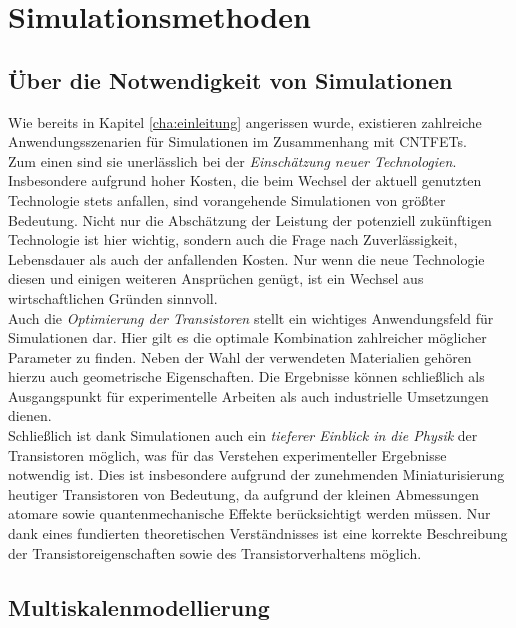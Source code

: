 \chapter{Simulationsmethoden}
\label{cha:simulationsmethoden}

\section{Über die Notwendigkeit von Simulationen}
\label{ueberdienotwendigkeitvonsimulationen}

Wie bereits in Kapitel \ref{cha:einleitung} angerissen wurde, existieren zahlreiche Anwendungsszenarien für Simulationen im Zusammenhang mit CNTFETs.\\
Zum einen sind sie unerlässlich bei der \textit{Einschätzung neuer Technologien}. Insbesondere aufgrund hoher Kosten, die beim Wechsel der aktuell genutzten Technologie stets anfallen, sind vorangehende Simulationen von größter Bedeutung. Nicht nur die Abschätzung der Leistung der potenziell zukünftigen Technologie ist hier wichtig, sondern auch die Frage nach Zuverlässigkeit, Lebensdauer als auch der anfallenden Kosten. Nur wenn die neue Technologie diesen und einigen weiteren Ansprüchen genügt, ist ein Wechsel aus wirtschaftlichen Gründen sinnvoll.\\
Auch die \textit{Optimierung der Transistoren} stellt ein wichtiges Anwendungsfeld für Simulationen dar.
Hier gilt es die optimale Kombination zahlreicher möglicher Parameter zu finden.
Neben der Wahl der verwendeten Materialien gehören hierzu auch geometrische Eigenschaften.
Die Ergebnisse können schließlich als Ausgangspunkt für experimentelle Arbeiten als auch industrielle Umsetzungen dienen.\\
Schließlich ist dank Simulationen auch ein \textit{tieferer Einblick in die Physik} der Transistoren möglich, was für das Verstehen experimenteller Ergebnisse notwendig ist.
Dies ist insbesondere aufgrund der zunehmenden Miniaturisierung heutiger Transistoren von Bedeutung, da aufgrund der kleinen Abmessungen atomare sowie quantenmechanische Effekte berücksichtigt werden müssen.
Nur dank eines fundierten theoretischen Verständnisses ist eine korrekte Beschreibung der Transistoreigenschaften sowie des Transistorverhaltens möglich.

\section{Multiskalenmodellierung}
\label{multiskalenmodellierung}

